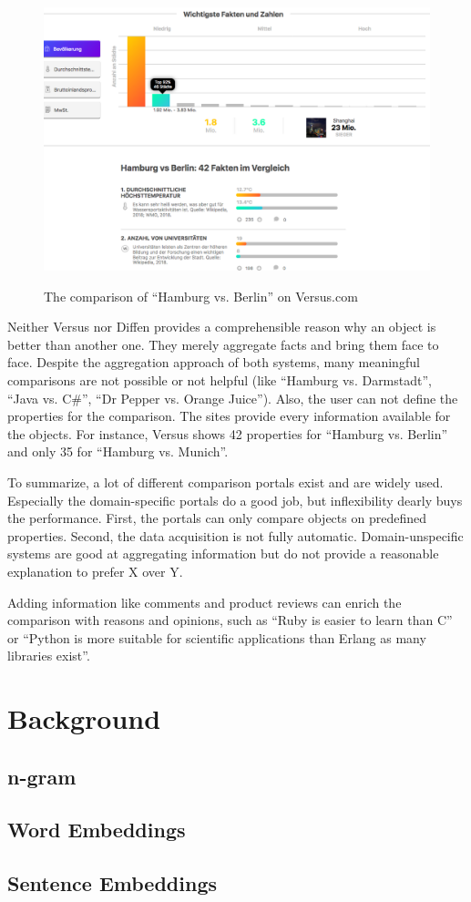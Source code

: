\begin{figure}[h]
\includegraphics[width=1\textwidth]{images/ds-sys/versus}
\label{img:versus}
\caption{The comparison of \enquote{Hamburg vs. Berlin} on Versus.com}
\end{figure}

Neither Versus nor Diffen provides a comprehensible reason why an object is better than another one. They merely aggregate facts and bring them face to face. Despite the aggregation approach of both systems, many meaningful comparisons are not possible or not helpful (like \enquote{Hamburg vs. Darmstadt}, \enquote{Java vs. C\#}, \enquote{Dr Pepper vs. Orange Juice}).
Also, the user can not define the properties for the comparison. The sites provide every information available for the objects. For instance, Versus shows 42 properties for \enquote{Hamburg vs. Berlin} and only 35 for \enquote{Hamburg vs. Munich}.
\newline

To summarize, a lot of different comparison portals exist and are widely used. Especially the domain-specific portals do a good job, but inflexibility dearly buys the performance. First, the portals can only compare objects on predefined properties. Second, the data acquisition is not fully automatic. Domain-unspecific systems are good at aggregating information but do not provide a reasonable explanation to prefer X over Y.

Adding information like comments and product reviews can enrich the comparison with reasons and opinions, such as \enquote{Ruby is easier to learn than C} or \enquote{Python is more suitable for scientific applications than Erlang as many libraries exist}.

\section{Background}
\subsection{n-gram}
\subsection{Word Embeddings}
\subsection{Sentence Embeddings}
